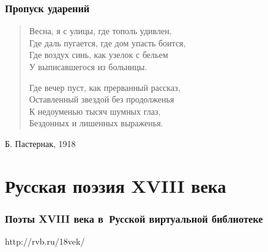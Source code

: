 \documentclass{beamer}
\begin{document}
\begin{frame}
\frametitle{Пропуск ударений}

\begin{verse}
Весна, я с улицы, где тополь удивлен, \\
Где даль пугается, где дом упасть боится,\\ 
Где воздух синь, как узелок с бельем \\
\alert{У выписавшегося из больницы}. 

Где вечер пуст, как прерванный рассказ,\\ 
Оставленный звездой без продолженья \\
К недоуменью тысяч шумных глаз, \\
Бездонных и лишенных выраженья. 
\end{verse}

Б. Пастернак, 1918

\end{frame}



\section{Русская поэзия XVIII века}\label{sec:sys} %

\begin{frame}
\frametitle{Поэты XVIII века в~Русской виртуальной библиотеке}

\begin{center}
{\LARGE http://rvb.ru/18vek/}
\end{center}

\end{frame}

%
\end{document}
